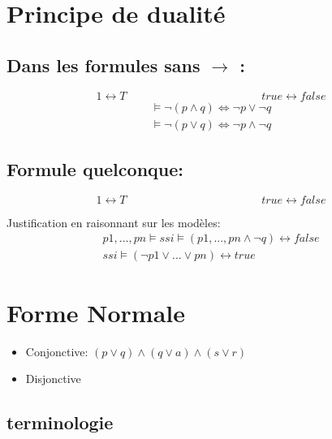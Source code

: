 \section{Principe de dualité }

\subsection{Dans les formules sans $\rightarrow$ :}

\begin{equation}
1 \leftrightarrow T \hspace{5cm} true \leftrightarrow false 
\end{equation}
\begin{align*}
\models \lnot ( p \land q)  \Leftrightarrow \lnot p \lor \lnot q \\
\models \lnot ( p \lor q)  \Leftrightarrow \lnot p \land \lnot q 
\end{align*}

\subsection{Formule quelconque:}

\begin{equation}
	1 \leftrightarrow T \hspace{5cm} true \leftrightarrow false 
\end{equation}

 Justification en raisonnant sur les modèles:
 \begin{align*}
	 p1,...,pn \models ssi \models (p1,...,pn \land \lnot q) \leftrightarrow false \\
	 ssi \models ( \lnot p1 \lor ... \lor pn) \leftrightarrow true
 \end{align*}

\section{Forme Normale}

\begin{itemize}
  \item Conjonctive: $( p \lor q ) \land ( q \lor a ) \land ( s \lor r )$  
  \item Disjonctive
\end{itemize}

\subsection{terminologie}

